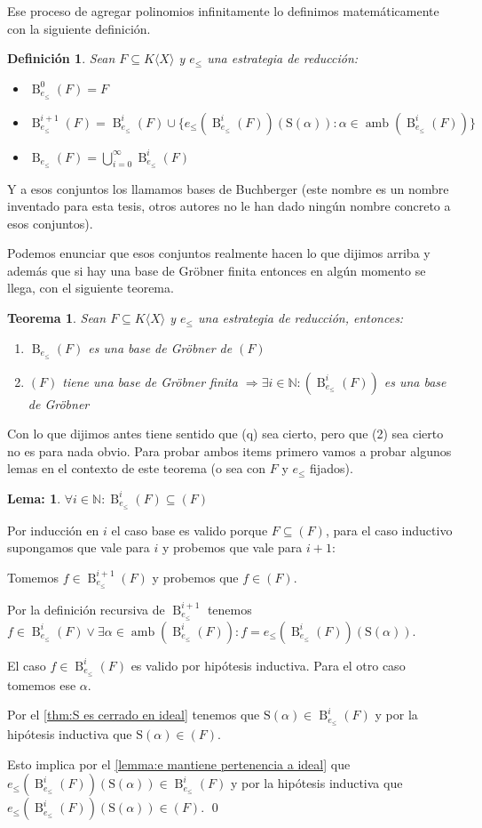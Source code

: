 \documentclass[12pt]{report}
\theoremstyle{customstyle}
\newtheorem{definition}{Definición}[chapter]
\newtheorem{theorem}{Teorema}[chapter]
\newtheorem{lemma}{Lema:}[chapter]
\renewenvironment{proof}[1][\proofname]{{\bfseries #1: }}{\qed} %
\theoremstyle{factstyle}
\DeclareMathOperator{\amb}{amb}
\renewcommand{\S}{\text{S}}
\DeclareMathOperator{\B}{B}
\begin{document}
Ese proceso de agregar polinomios infinitamente lo definimos matemáticamente con la siguiente definición.

\begin{definition}
  Sean $F ⊆ K⟨X⟩$ y $e_≤$ una estrategia de reducción:
  \begin{itemize}
    \item $\B_{e_≤}^0(F) = F$
    \item $\B_{e_≤}^{i + 1}(F) = \B_{e_≤}^i(F) ∪ \{e_≤(\B_{e_≤}^i(F))(\S(α)) : α ∈ \amb(\B_{e_≤}^i(F))\}$
    \item $\B_{e_≤}(F) = ⋃_{i = 0}^∞ \B_{e_≤}^i(F)$
  \end{itemize}
\end{definition}

Y a esos conjuntos los llamamos bases de Buchberger (este nombre es un nombre inventado para esta tesis, otros autores no le han dado ningún nombre concreto a esos conjuntos).

Podemos enunciar que esos conjuntos realmente hacen lo que dijimos arriba y además que si hay una base de Gröbner finita entonces en algún momento se llega, con el siguiente teorema.

\begin{theorem}\label{thm:Buchberger correctitud}
  Sean $F ⊆ K⟨X⟩$ y $e_≤$ una estrategia de reducción, entonces:
  \begin{enumerate}
    \item $\B_{e_≤}(F)$ es una base de Gröbner de $(F)$
    \item $(F)$ tiene una base de Gröbner finita $⇒ ∃i ∈ ℕ : (\B_{e_≤}^i(F))$ es una base de Gröbner
  \end{enumerate}
\end{theorem}

Con lo que dijimos antes tiene sentido que (q) sea cierto, pero que (2) sea cierto no es para nada obvio. Para probar ambos items primero vamos a probar algunos lemas en el contexto de este teorema (o sea con $F$ y $e_≤$ fijados).

\begin{lemma}\label{lemma:Buchberger correctitud:3}
  $∀i ∈ ℕ : \B_{e_≤}^{i}(F) ⊆ (F)$
\end{lemma}
\begin{proof}
  Por inducción en $i$ el caso base es valido porque $F ⊆ (F)$, para el caso inductivo supongamos que vale para $i$ y probemos que vale para $i + 1$:

  Tomemos $f ∈ \B_{e_≤}^{i + 1}(F)$ y probemos que $f ∈ (F)$.

  Por la definición recursiva de $\B_{e_≤}^{i + 1}$ tenemos $f ∈ \B_{e_≤}^i(F) ∨ ∃α ∈ \amb(\B_{e_≤}^i(F)) : f = e_≤(\B_{e_≤}^i(F))(\S(α))$.

  El caso $f ∈ \B_{e_≤}^i(F)$ es valido por hipótesis inductiva. Para el otro caso tomemos ese $α$.

  Por el \cref{thm:S es cerrado en ideal} tenemos que $\S(α) ∈ \B_{e_≤}^i(F)$ y por la hipótesis inductiva que $\S(α) ∈ (F)$.

  Esto implica por el \cref{lemma:e mantiene pertenencia a ideal} que $e_≤(\B_{e_≤}^i(F))(\S(α)) ∈ \B_{e_≤}^i(F)$ y por la hipótesis inductiva que $e_≤(\B_{e_≤}^i(F))(\S(α)) ∈ (F)$.
\end{proof}
\end{document}
